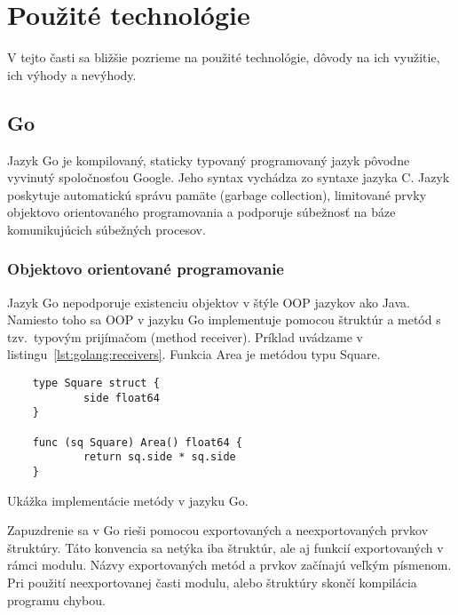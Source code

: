 \chapter{Pou\v{z}it\'{e} technol\'{o}gie}
\label{ch:tech}

V tejto časti sa bližšie pozrieme na použité technológie, dôvody na ich využitie,
ich výhody a nevýhody.

\section{Go}
\label{sec:golang}

Jazyk Go je kompilovaný, staticky typovaný programovaný jazyk pôvodne vyvinutý
spoločnosťou Google. Jeho syntax vychádza zo syntaxe jazyka C. Jazyk poskytuje
automatickú správu pamäte (garbage collection), limitované prvky objektovo orientovaného
programovania a podporuje súbežnosť na báze komunikujúcich súbežných procesov.\cite{GolangFeatures}

\subsection{Objektovo orientované programovanie}
\label{sec:golang:oop}

Jazyk Go nepodporuje existenciu objektov v štýle OOP jazykov ako Java. Namiesto toho
sa OOP v jazyku Go implementuje pomocou štruktúr a metód s tzv.\ typovým prijímačom
(method receiver). Príklad uvádzame v listingu~\ref{lst:golang:receivers}. Funkcia
Area je metódou typu Square.

\begin{listing}[h]
  \begin{verbatim}
    type Square struct {
            side float64
    }

    func (sq Square) Area() float64 {
            return sq.side * sq.side
    }
  \end{verbatim}
  \caption{Ukážka implementácie metódy v jazyku Go.}
  \label{lst:golang:receivers}
\end{listing}

Zapuzdrenie sa v Go rieši pomocou exportovaných a neexportovaných prvkov štruktúry.
Táto konvencia sa netýka iba štruktúr, ale aj funkcií exportovaných v rámci modulu.
Názvy exportovaných metód a prvkov začínajú veľkým písmenom. Pri použití neexportovanej
časti modulu, alebo štruktúry skončí kompilácia programu chybou.

